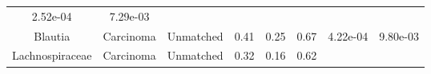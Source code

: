 \documentclass[12pt,]{article}
\begin{document}
\begin{longtable}[]{@{}cccccccc@{}}
\begin{minipage}[t]{0.06\columnwidth}
2.52e-04\strut
\end{minipage} & \begin{minipage}[t]{0.06\columnwidth}\centering\strut
7.29e-03\strut
\end{minipage}\tabularnewline
\begin{minipage}[t]{0.19\columnwidth}\centering\strut
Blautia\strut
\end{minipage} & \begin{minipage}[t]{0.07\columnwidth}\centering\strut
Carcinoma\strut
\end{minipage} & \begin{minipage}[t]{0.09\columnwidth}\centering\strut
Unmatched\strut
\end{minipage} & \begin{minipage}[t]{0.03\columnwidth}\centering\strut
0.41\strut
\end{minipage} & \begin{minipage}[t]{0.14\columnwidth}\centering\strut
0.25\strut
\end{minipage} & \begin{minipage}[t]{0.14\columnwidth}\centering\strut
0.67\strut
\end{minipage} & \begin{minipage}[t]{0.06\columnwidth}\centering\strut
4.22e-04\strut
\end{minipage} & \begin{minipage}[t]{0.06\columnwidth}\centering\strut
9.80e-03\strut
\end{minipage}\tabularnewline
\begin{minipage}[t]{0.19\columnwidth}\centering\strut
Lachnospiraceae\strut
\end{minipage} & \begin{minipage}[t]{0.07\columnwidth}\centering\strut
Carcinoma\strut
\end{minipage} & \begin{minipage}[t]{0.09\columnwidth}\centering\strut
Unmatched\strut
\end{minipage} & \begin{minipage}[t]{0.03\columnwidth}\centering\strut
0.32\strut
\end{minipage} & \begin{minipage}[t]{0.14\columnwidth}\centering\strut
0.16\strut
\end{minipage} & \begin{minipage}[t]{0.14\columnwidth}\centering\strut
0.62\strut
\end{minipage} & \begin{minipage}[t]{0.06\columnwidth}\centering\strut

\end{minipage}
\end{longtable}
\end{document}
